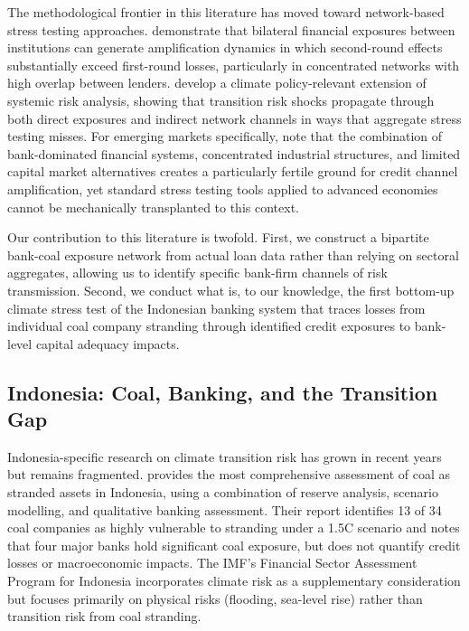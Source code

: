 The methodological frontier in this literature has moved toward network-based stress testing approaches. \citet{Roncoroni2021} demonstrate that bilateral financial exposures between institutions can generate amplification dynamics in which second-round effects substantially exceed first-round losses, particularly in concentrated networks with high overlap between lenders. \citet{Battiston2021} develop a climate policy-relevant extension of systemic risk analysis, showing that transition risk shocks propagate through both direct exposures and indirect network channels in ways that aggregate stress testing misses. For emerging markets specifically, \citet{IMF2024Indonesia} note that the combination of bank-dominated financial systems, concentrated industrial structures, and limited capital market alternatives creates a particularly fertile ground for credit channel amplification, yet standard stress testing tools applied to advanced economies cannot be mechanically transplanted to this context.

Our contribution to this literature is twofold. First, we construct a bipartite bank-coal exposure network from actual loan data rather than relying on sectoral aggregates, allowing us to identify specific bank-firm channels of risk transmission. Second, we conduct what is, to our knowledge, the first bottom-up climate stress test of the Indonesian banking system that traces losses from individual coal company stranding through identified credit exposures to bank-level capital adequacy impacts.

\subsection{Indonesia: Coal, Banking, and the Transition Gap}
\label{subsec:indonesia_gap}

Indonesia-specific research on climate transition risk has grown in recent years but remains fragmented. \citet{IESR2023} provides the most comprehensive assessment of coal as stranded assets in Indonesia, using a combination of reserve analysis, scenario modelling, and qualitative banking assessment. Their report identifies 13 of 34 coal companies as highly vulnerable to stranding under a 1.5\textdegree C scenario and notes that four major banks hold significant coal exposure, but does not quantify credit losses or macroeconomic impacts. The IMF's Financial Sector Assessment Program for Indonesia \citep{IMF2024Indonesia, IMF2025IndonesiaStress} incorporates climate risk as a supplementary consideration but focuses primarily on physical risks (flooding, sea-level rise) rather than transition risk from coal stranding.

